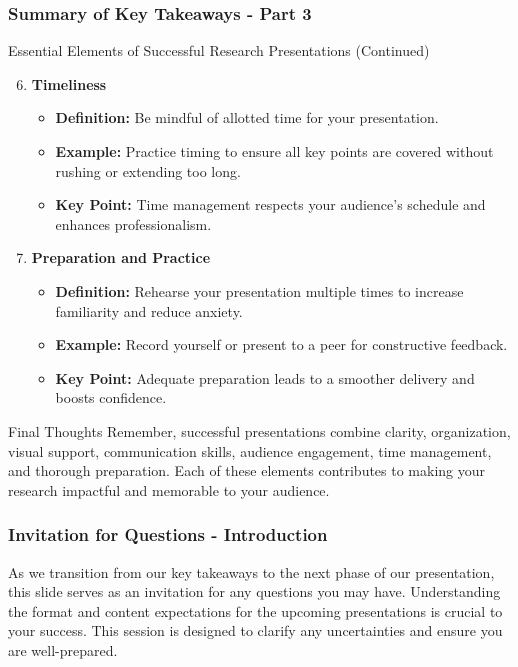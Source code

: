 \documentclass[aspectratio=169]{beamer}
\begin{document}
\begin{frame}[fragile]
    \frametitle{Summary of Key Takeaways - Part 3}
    \begin{block}{Essential Elements of Successful Research Presentations (Continued)}
        \begin{enumerate}
            \setcounter{enumi}{5}
            \item \textbf{Timeliness}
                \begin{itemize}
                    \item \textbf{Definition:} Be mindful of allotted time for your presentation.
                    \item \textbf{Example:} Practice timing to ensure all key points are covered without rushing or extending too long.
                    \item \textbf{Key Point:} Time management respects your audience’s schedule and enhances professionalism.
                \end{itemize}
            \item \textbf{Preparation and Practice}
                \begin{itemize}
                    \item \textbf{Definition:} Rehearse your presentation multiple times to increase familiarity and reduce anxiety.
                    \item \textbf{Example:} Record yourself or present to a peer for constructive feedback.
                    \item \textbf{Key Point:} Adequate preparation leads to a smoother delivery and boosts confidence.
                \end{itemize}
        \end{enumerate}
    \end{block}
    \begin{block}{Final Thoughts}
        Remember, successful presentations combine clarity, organization, visual support, communication skills, audience engagement, time management, and thorough preparation. Each of these elements contributes to making your research impactful and memorable to your audience.
    \end{block}
\end{frame}

\begin{frame}[fragile]
    \frametitle{Invitation for Questions - Introduction}
    As we transition from our key takeaways to the next phase of our presentation, this slide serves as an invitation for any questions you may have. Understanding the format and content expectations for the upcoming presentations is crucial to your success. This session is designed to clarify any uncertainties and ensure you are well-prepared.
\end{frame}
\end{document}
